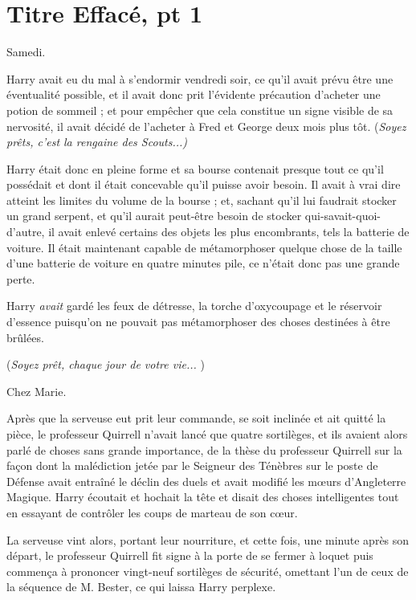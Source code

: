 
\chapter{Titre Effacé, pt 1}

Samedi.

Harry avait eu du mal à s'endormir vendredi soir, ce qu'il avait prévu être une éventualité possible, et il avait donc prit l'évidente précaution d'acheter une potion de sommeil ; et pour empêcher que cela constitue un signe visible de sa nervosité, il avait décidé de l'acheter à Fred et George deux mois plus tôt. (\emph{Soyez prêts, c'est la rengaine des Scouts...)} 

Harry était donc en pleine forme et sa bourse contenait presque tout ce qu'il possédait et dont il était concevable qu'il puisse avoir besoin. Il avait à vrai dire atteint les limites du volume de la bourse ; et, sachant qu'il lui faudrait stocker un grand serpent, et qu'il aurait peut-être besoin de stocker qui-savait-quoi-d'autre, il avait enlevé certains des objets les plus encombrants, tels la batterie de voiture. Il était maintenant capable de métamorphoser quelque chose de la taille d'une batterie de voiture en quatre minutes pile, ce n'était donc pas une grande perte.

Harry \emph{avait}  gardé les feux de détresse, la torche d'oxycoupage et le réservoir d'essence puisqu'on ne pouvait pas métamorphoser des choses destinées à être brûlées.

(\emph{Soyez prêt, chaque jour de votre vie...} )

Chez Marie.

Après que la serveuse eut prit leur commande, se soit inclinée et ait quitté la pièce, le professeur Quirrell n'avait lancé que quatre sortilèges, et ils avaient alors parlé de choses sans grande importance, de la thèse du professeur Quirrell sur la façon dont la malédiction jetée par le Seigneur des Ténèbres sur le poste de Défense avait entraîné le déclin des duels et avait modifié les mœurs d'Angleterre Magique. Harry écoutait et hochait la tête et disait des choses intelligentes tout en essayant de contrôler les coups de marteau de son cœur.

La serveuse vint alors, portant leur nourriture, et cette fois, une minute après son départ, le professeur Quirrell fit signe à la porte de se fermer à loquet puis commença à prononcer vingt-neuf sortilèges de sécurité, omettant l'un de ceux de la séquence de M. Bester, ce qui laissa Harry perplexe.

